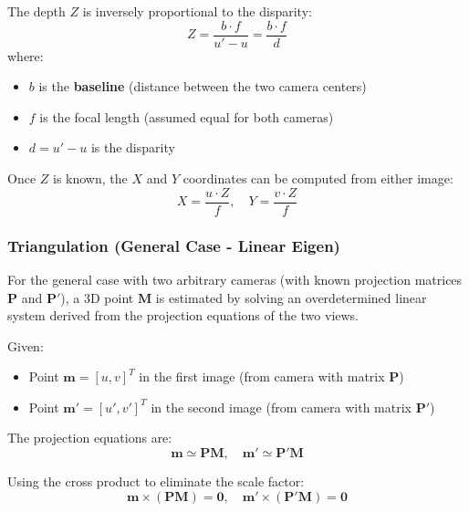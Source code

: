 \documentclass[11pt,a4paper]{article}
\theoremstyle{definition}
\theoremstyle{plain}
\theoremstyle{remark}
\begin{document}
The depth $Z$ is inversely proportional to the disparity:
\begin{equation} \label{eq:triangulation_depth}
    Z = \frac{b \cdot f}{u' - u} = \frac{b \cdot f}{d}
\end{equation}
where:
\begin{itemize}
    \item $b$ is the \textbf{baseline} (distance between the two camera centers)
    \item $f$ is the focal length (assumed equal for both cameras)
    \item $d = u' - u$ is the disparity
\end{itemize}

Once $Z$ is known, the $X$ and $Y$ coordinates can be computed from either image:
\begin{equation} \nonumber
    X = \frac{u \cdot Z}{f}, \quad Y = \frac{v \cdot Z}{f}
\end{equation}

\subsubsection{Triangulation (General Case - Linear Eigen)}

For the general case with two arbitrary cameras (with known projection matrices $\mathbf{P}$ and $\mathbf{P}'$), a 3D point $\mathbf{M}$ is estimated by solving an overdetermined linear system derived from the projection equations of the two views.

Given:
\begin{itemize}
    \item Point $\mathbf{m} = [u, v]^T$ in the first image (from camera with matrix $\mathbf{P}$)
    \item Point $\mathbf{m}' = [u', v']^T$ in the second image (from camera with matrix $\mathbf{P}'$)
\end{itemize}

The projection equations are:
\begin{equation} \label{eq:triangulation_projections}
    \mathbf{m} \simeq \mathbf{P} \mathbf{M}, \quad \mathbf{m}' \simeq \mathbf{P}' \mathbf{M}
\end{equation}

Using the cross product to eliminate the scale factor:
\begin{equation} \nonumber
    \mathbf{m} \times (\mathbf{P} \mathbf{M}) = \mathbf{0}, \quad \mathbf{m}' \times (\mathbf{P}' \mathbf{M}) = \mathbf{0}
\end{equation}
\end{document}
